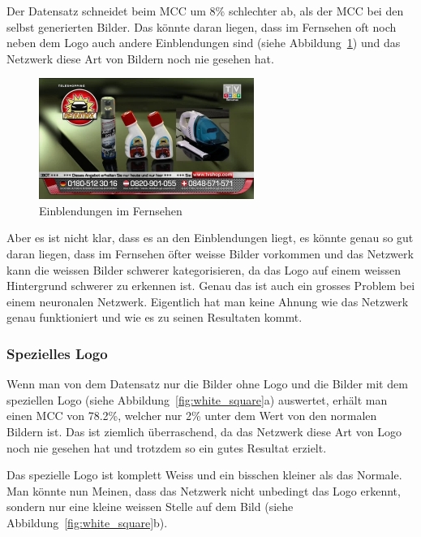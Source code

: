\documentclass[12pt,a4paper]{report}
\begin{document}
Der Datensatz schneidet beim MCC um 8\% schlechter ab, als der MCC bei den selbst generierten Bilder.
Das könnte daran liegen, dass im Fernsehen oft noch neben dem Logo auch andere Einblendungen sind (siehe Abbildung~\ref{fig:einblenden})
und das Netzwerk diese Art von Bildern noch nie gesehen hat.
\begin{figure}[h]%
    \centering
    \includegraphics[width=7cm]{assets/images/tv_einblenden.jpg}%
    \caption{Einblendungen im Fernsehen}%
    \label{fig:einblenden}%
\end{figure}
Aber es ist nicht klar, dass es an den Einblendungen liegt, es könnte genau so gut daran liegen,
dass im Fernsehen öfter weisse Bilder vorkommen und das Netzwerk kann die weissen Bilder schwerer kategorisieren,
da das Logo auf einem weissen Hintergrund schwerer zu erkennen ist.
Genau das ist auch ein grosses Problem bei einem neuronalen Netzwerk.
Eigentlich hat man keine Ahnung wie das Netzwerk genau funktioniert und wie es zu seinen Resultaten kommt.
\subsubsection{Spezielles Logo}
Wenn man von dem Datensatz nur die Bilder ohne Logo und die Bilder mit dem speziellen Logo (siehe Abbildung~\ref{fig:white_square}a) auswertet,
erhält man einen MCC von 78.2\%, welcher nur 2\% unter dem Wert von den normalen Bildern ist.
Das ist ziemlich überraschend, da das Netzwerk diese Art von Logo noch nie gesehen hat und trotzdem so ein gutes Resultat erzielt.

Das spezielle Logo ist komplett Weiss und ein bisschen kleiner als das Normale.
Man könnte nun Meinen, dass das Netzwerk nicht unbedingt das Logo erkennt,
sondern nur eine kleine weissen Stelle auf dem Bild (siehe Abbildung~\ref{fig:white_square}b).
\end{document}
